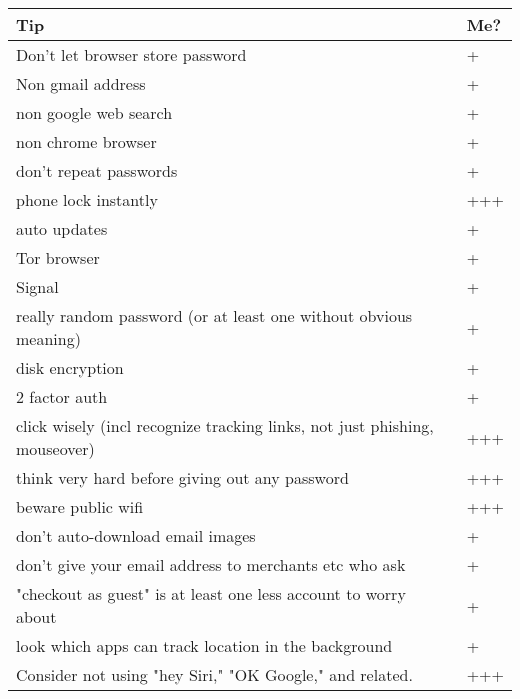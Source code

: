 \documentclass{tufte-handout}
\begin{document}
\begin{tabular}{p{5in}l}

\textbf{Tip} & \textbf{Me?} \\
\hline

Don't let browser store password & + \\

Non gmail address & + \\

non google web search & + \\

non chrome browser & + \\

don't repeat passwords & + \\

phone lock instantly & +++ \\

auto updates & + \\

Tor browser & + \\

Signal & + \\

really random password (or at least one without obvious meaning) & + \\

disk encryption & + \\

2 factor auth & + \\

click wisely (incl recognize tracking links, not just phishing, mouseover) & +++ \\

think very hard before giving out any password & +++ \\

beware public wifi & +++ \\

don't auto-download email images & + \\

don't give your email address to merchants etc who ask & + \\

"checkout as guest" is at least one less account to worry about & + \\

look which apps can track location in the background & + \\

Consider not using "hey Siri," "OK Google," and related. & +++ \\


\end{tabular}
\end{document}
